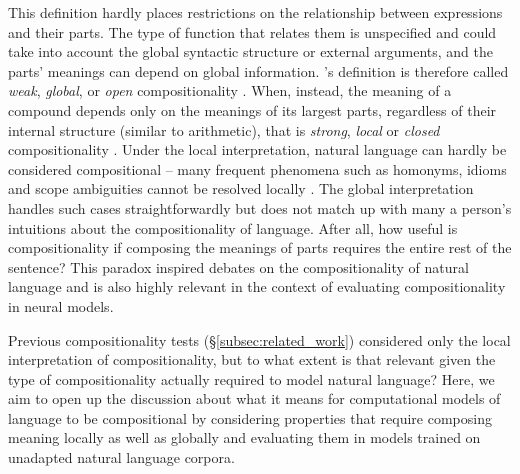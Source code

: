 \vspace{-.5mm}
\noindent This definition hardly places restrictions on the relationship between expressions and their parts.
The type of function that relates them is unspecified and could take into account the global syntactic structure or external arguments, and the parts' meanings can depend on global information.
\citeauthor{partee1984compositionality}'s definition is therefore called \textit{weak}, \textit{global}, or \textit{open} compositionality \citep{szabo2012case, garcia2019open}.
When, instead, the meaning of a compound depends only on the meanings of its largest parts, regardless of their internal structure (similar to arithmetic),
that is \emph{strong}, \emph{local} or \textit{closed} compositionality \citep{jacobson2002dis, szabo2012case}.
Under the local interpretation, natural language can hardly be considered compositional -- many frequent phenomena such as homonyms, idioms and scope ambiguities cannot be resolved locally \citep{pagin2010compositionality, pavlick2016most}.
The global interpretation handles such cases straightforwardly but does not match up with many a person's intuitions about the compositionality of language.
After all, how useful is compositionality if composing the meanings of parts requires the entire rest of the sentence?
This paradox inspired debates on the compositionality of natural language and is also highly relevant in the context of evaluating compositionality in neural models.

Previous compositionality tests (\S\ref{subsec:related_work}) considered only the local interpretation of compositionality, but to what extent is that relevant given the type of compositionality actually required to model natural language?
Here, we aim to open up the discussion about what it means for computational models of language to be compositional by considering properties that require composing meaning locally as well as globally and evaluating them in models trained on unadapted natural language corpora.
